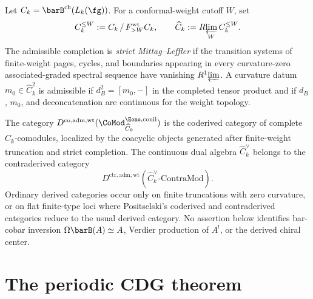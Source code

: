 \begin{definition}
\label{def:admissible-positselski-ambient}
%
%
Let $C_k=\barB^{\mathrm{ch}}(L_k(\fg))$.  For a conformal-weight
cutoff $W$, set
\[
C_k^{\leq W}:=
C_k\,/\,F^{\mathrm{wt}}_{>W}C_k,
\qquad
\widehat C_k:=R\!\varprojlim_W C_k^{\leq W}.
\]
The admissible completion is \emph{strict Mittag--Leffler} if the
transition systems of finite-weight pages, cycles, and boundaries
appearing in every curvature-zero associated-graded spectral sequence
have vanishing $R^1\!\varprojlim$.  A curvature datum
$m_0\in\widehat C_k^2$ is admissible if
$d_B^2=[m_0,-]$ in the completed tensor product and if
$d_B$, $m_0$, and deconcatenation are continuous for the
weight topology.

The category
$D^{\mathrm{co},\mathrm{adm,wt}}
(\CoMod^{\Eone,\mathrm{conil}}_{\widehat C_k})$
is the coderived category of complete $\widehat C_k$-comodules,
localized by the coacyclic objects generated after finite-weight
truncation and strict completion.  The continuous dual algebra
\(\widehat C_k^\vee\) belongs to the contraderived category
\[
D^{\mathrm{ctr},\mathrm{adm,wt}}
(\widehat C_k^\vee\text{-}\mathrm{ContraMod}).
\]
Ordinary derived categories occur only on finite truncations with
zero curvature, or on flat finite-type loci where Positselski's
coderived and contraderived categories reduce to the usual derived
category.  No assertion below identifies bar-cobar inversion
$\Omega\barB(A)\simeq A$, Verdier production of $A^!$, or the
derived chiral center.
\end{definition}

\section{The periodic CDG theorem}
\label{sec:periodic-cdg-theorem}

